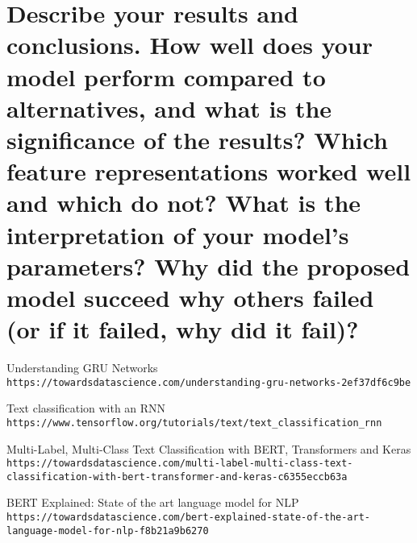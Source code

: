 \documentclass[12pt]{article}
\begin{document}
\section{Describe your results and conclusions. How well does your model perform compared to
alternatives, and what is the significance of the results? Which feature representations worked
well and which do not? What is the interpretation of your model’s parameters? Why did the
proposed model succeed why others failed (or if it failed, why did it fail)?}

\medskip
\begin{thebibliography}{12}
    
    Understanding GRU Networks
    \\\texttt{https://towardsdatascience.com/understanding-gru-networks-2ef37df6c9be}
    
    Text classification with an RNN
    \\\texttt{https://www.tensorflow.org/tutorials/text/text\_classification\_rnn}

    Multi-Label, Multi-Class Text Classification with BERT, Transformers and Keras
    \\\texttt{https://towardsdatascience.com/multi-label-multi-class-text-classification-with-bert-transformer-and-keras-c6355eccb63a}

    BERT Explained: State of the art language model for NLP
    \\\texttt{https://towardsdatascience.com/bert-explained-state-of-the-art-language-model-for-nlp-f8b21a9b6270}

    \end{thebibliography}
\end{document}
